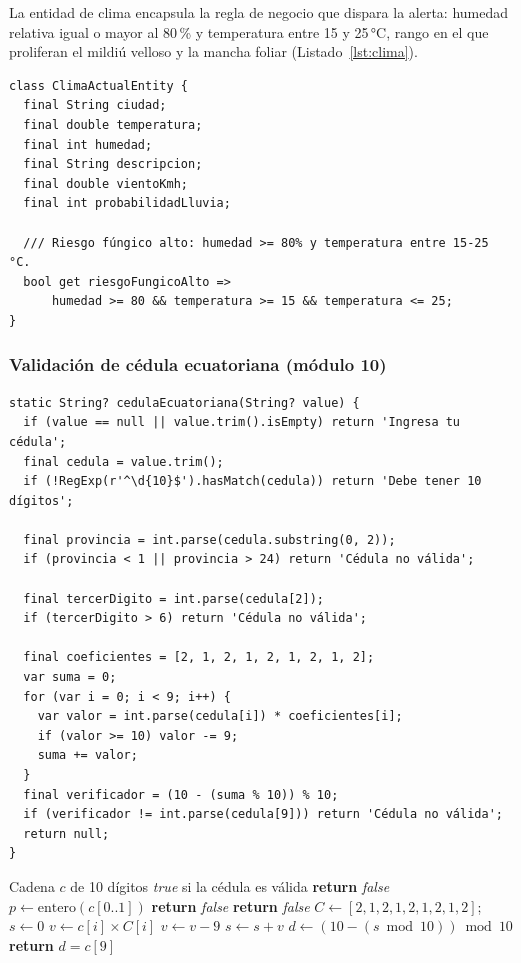 \documentclass[12pt,a4paper]{article}
\begin{document}
La entidad de clima encapsula la regla de negocio que dispara la alerta: humedad
relativa igual o mayor al 80\,\% y temperatura entre 15 y 25\,°C, rango en el que
proliferan el mildiú velloso y la mancha foliar (Listado~\ref{lst:clima}).

\begin{lstlisting}[caption={Regla de alerta de riesgo fúngico}, label={lst:clima}]
class ClimaActualEntity {
  final String ciudad;
  final double temperatura;
  final int humedad;
  final String descripcion;
  final double vientoKmh;
  final int probabilidadLluvia;

  /// Riesgo fúngico alto: humedad >= 80% y temperatura entre 15-25 °C.
  bool get riesgoFungicoAlto =>
      humedad >= 80 && temperatura >= 15 && temperatura <= 25;
}
\end{lstlisting}

\subsubsection{Validación de cédula ecuatoriana (módulo 10)}

\begin{lstlisting}[caption={Validador de cédula ecuatoriana}, label={lst:cedula}]
static String? cedulaEcuatoriana(String? value) {
  if (value == null || value.trim().isEmpty) return 'Ingresa tu cédula';
  final cedula = value.trim();
  if (!RegExp(r'^\d{10}$').hasMatch(cedula)) return 'Debe tener 10 dígitos';

  final provincia = int.parse(cedula.substring(0, 2));
  if (provincia < 1 || provincia > 24) return 'Cédula no válida';

  final tercerDigito = int.parse(cedula[2]);
  if (tercerDigito > 6) return 'Cédula no válida';

  final coeficientes = [2, 1, 2, 1, 2, 1, 2, 1, 2];
  var suma = 0;
  for (var i = 0; i < 9; i++) {
    var valor = int.parse(cedula[i]) * coeficientes[i];
    if (valor >= 10) valor -= 9;
    suma += valor;
  }
  final verificador = (10 - (suma % 10)) % 10;
  if (verificador != int.parse(cedula[9])) return 'Cédula no válida';
  return null;
}
\end{lstlisting}

\begin{algorithm}[H]
\caption{Validación de cédula ecuatoriana (módulo 10)}
\label{alg:cedula}
\begin{algorithmic}[1]
\Require Cadena $c$ de 10 dígitos
\Ensure \textit{true} si la cédula es válida
 \State \textbf{return} \textit{false} \EndIf
\State $p \gets \text{entero}(c[0..1])$ 
 \State \textbf{return} \textit{false} \EndIf
{} \State \textbf{return} \textit{false} \EndIf
\State $C \gets [2,1,2,1,2,1,2,1,2]$; \quad $s \gets 0$
  \State $v \gets c[i] \times C[i]$
   \State $v \gets v - 9$ \EndIf
  \State $s \gets s + v$
\EndFor
\State $d \gets (10 - (s \bmod 10)) \bmod 10$
\State \textbf{return} $d = c[9]$
\end{algorithmic}
\end{algorithm}
\end{document}
